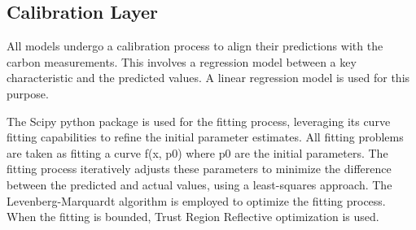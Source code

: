 \subsection{Calibration Layer}

All models undergo a calibration process to align their predictions with the carbon measurements. This involves a regression model between a key characteristic and the predicted values. A linear regression model is used for this purpose.

The Scipy python package is used for the fitting process\cite{virtanen_scipy_2020}, leveraging its curve fitting capabilities to refine the initial parameter estimates. All fitting problems are taken as fitting a curve f(x, p0) where p0 are the initial parameters. The fitting process iteratively adjusts these parameters to minimize the difference between the predicted and actual values, using a least-squares approach. The Levenberg-Marquardt algorithm is employed to optimize the fitting process\cite{more_levenberg-marquardt_1978}. When the fitting is bounded, Trust Region Reflective optimization \cite{branch_subspace_1999} is used.